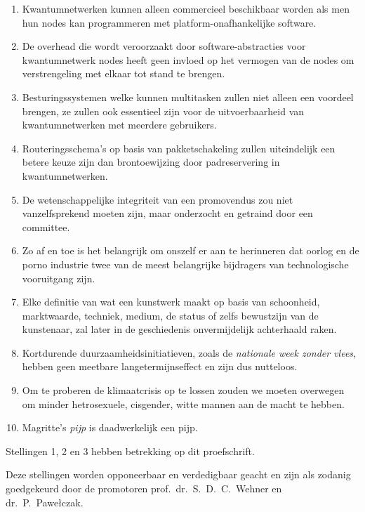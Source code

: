 \begin{enumerate}[widest=10]
    \item Kwantumnetwerken kunnen alleen commercieel beschikbaar worden als men hun nodes kan
          programmeren met platform-onafhankelijke software.
    \item De overhead die wordt veroorzaakt door software-abstracties voor kwantumnetwerk nodes
          heeft geen invloed op het vermogen van de nodes om verstrengeling met elkaar tot stand te
          brengen.
    \item Besturingssystemen welke kunnen multitasken zullen niet alleen een voordeel brengen, ze
          zullen ook essentieel zijn voor de uitvoerbaarheid van kwantumnetwerken met meerdere
          gebruikers.
    \item Routeringsschema's op basis van pakketschakeling zullen uiteindelijk een betere keuze zijn
          dan brontoewijzing door padreservering in kwantumnetwerken.
    \item De wetenschappelijke integriteit van een promovendus zou niet vanzelfsprekend moeten zijn,
          maar onderzocht en getraind door een committee.
    \item Zo af en toe is het belangrijk om onszelf er aan te herinneren dat oorlog en de porno
          industrie twee van de meest belangrijke bijdragers van technologische vooruitgang zijn.
    \item Elke definitie van wat een kunstwerk maakt op basis van schoonheid, marktwaarde, techniek,
          medium, de status of zelfs bewustzijn van de kunstenaar, zal later in de geschiedenis
          onvermijdelijk achterhaald raken.
    \item Kortdurende duurzaamheidsinitiatieven, zoals de \emph{nationale week zonder vlees}, hebben
          geen meetbare langetermijnseffect en zijn dus nutteloos.
    \item Om te proberen de klimaatcrisis op te lossen zouden we moeten overwegen om minder
          hetrosexuele, cisgender, witte mannen aan de macht te hebben.
    \item Magritte's \emph{pijp} is daadwerkelijk een pijp.
\end{enumerate}

\bigskip \noindent
Stellingen 1, 2 en 3 hebben betrekking op dit proefschrift.

\bigskip \noindent
Deze stellingen worden opponeerbaar en verdedigbaar geacht en zijn als zodanig goedgekeurd door de
promotoren prof.\ dr.\ S.\ D.\ C.\ Wehner en dr.\ P.\ Pawełczak.
